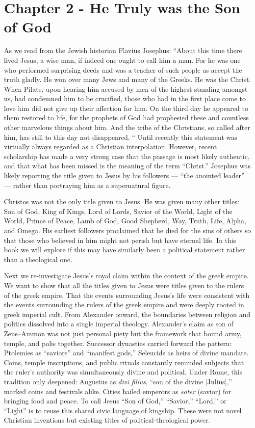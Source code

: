 \section{Chapter 2 - He Truly was the Son of God}\label{sec:chapter-2-he-truly-was-the-son-of-god}
As we read from the Jewish historian Flavius Josephus:
``About this time there lived Jesus, a wise man, if indeed one ought to call him a man.
For he was one who performed surprising deeds and was a teacher of such people as accept the truth gladly.
He won over many Jews and many of the Greeks.
He was the Christ.
When Pilate, upon hearing him accused by men of the highest standing amongst us, had condemned him to be crucified, those who had in the first place come to love him did not give up their affection for him.
On the third day he appeared to them restored to life, for the prophets of God had prophesied these and countless other marvelous things about him.
And the tribe of the Christians, so called after him, has still to this day not disappeared.
``
Until recently this statement was virtually always regarded as a Christian interpolation.
However, recent scholarship has made a very strong case that the passage is most likely authentic, and that what has been missed is the meaning of the term “Christ.”
Josephus was likely reporting the title given to Jesus by his followers — “the anointed leader” — rather than portraying him as a supernatural figure.

Christos was not the only title given to Jesus.
He was given many other titles: Son of God, King of Kings, Lord of Lords, Savior of the World, Light of the World, Prince of Peace, Lamb of God, Good Shepherd, Way, Truth, Life, Alpha, and Omega.
His earliest followers proclaimed that he died for the sins of others so that those who believed in him might not perish but have eternal life.
In this book we will explore if this may have similarly been a political statement rather than a theological one.


Next we re-investigate Jesus’s royal claim within the context of the greek empire.
We want to show that all the titles given to Jesus were titles given to the rulers of the greek empire.
That the events surrounding Jesus’s life were consistent with the events surrounding the rulers of the greek empire and were deeply rooted in greek imperial cult.
From Alexander onward, the boundaries between religion and politics dissolved into a single imperial theology.
Alexander’s claim as son of Zeus–Ammon was not just personal piety but the framework that bound army, temple, and polis together.
Successor dynasties carried forward the pattern: Ptolemies as “saviors” and “manifest gods,” Seleucids as heirs of divine mandate.
Coins, temple inscriptions, and public rituals constantly reminded subjects that the ruler’s authority was simultaneously divine and political.
Under Rome, this tradition only deepened: Augustus as \emph{divi filius}, “son of the divine [Julius],” marked coins and festivals alike.
Cities hailed emperors as \emph{soter} (savior) for bringing food and peace.
To call Jesus “Son of God,” “Savior,” “Lord,” or “Light” is to reuse this shared civic language of kingship.
These were not novel Christian inventions but existing titles of political-theological power.

